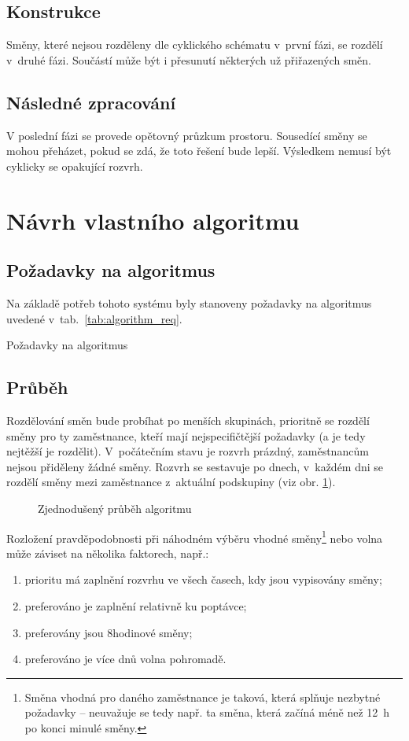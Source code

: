 \documentclass[twoside]{ctuthesis}
\begin{document}
\subsection{Konstrukce}
Směny, které nejsou rozděleny dle cyklického schématu v~první fázi, se rozdělí v~druhé fázi. Součástí může být i přesunutí některých už přiřazených směn.

\subsection{Následné zpracování}
V poslední fázi se provede opětovný průzkum prostoru. Sousedící směny se mohou přeházet, pokud se zdá, že toto řešení bude lepší. Výsledkem nemusí být cyklicky se opakující rozvrh.

\newpage
\section{Návrh vlastního algoritmu}

\subsection{Požadavky na algoritmus}
Na základě potřeb tohoto systému byly stanoveny požadavky na algoritmus uvedené v~tab.~\ref{tab:algorithm_req}.

\begin{table}[h!]
	
	\caption{Požadavky na algoritmus}
	\label{tab:algorithm_req}
\end{table}

\subsection{Průběh}
Rozdělování směn bude probíhat po menších skupinách, prioritně se rozdělí směny pro ty zaměstnance, kteří mají nejspecifičtější požadavky (a je tedy nejtěžší je rozdělit). V~počátečním stavu je rozvrh prázdný, zaměstnancům nejsou přiděleny žádné směny. Rozvrh se sestavuje po dnech, v~každém dni se rozdělí směny mezi zaměstnance z~aktuální podskupiny (viz obr. \ref{fig:dayflow}).

\begin{figure}[h]
	
	\caption{Zjednodušený průběh algoritmu}
	\label{fig:dayflow}
\end{figure}

Rozložení pravděpodobnosti při náhodném výběru vhodné směny\footnote{Směna vhodná pro daného zaměstnance je taková, která splňuje nezbytné požadavky -- neuvažuje se tedy např. ta směna, která začíná méně než 12~h po konci minulé směny.} nebo volna může záviset na několika faktorech, např.:
\begin{enumerate}
	\item prioritu má zaplnění rozvrhu ve všech časech, kdy jsou vypisovány směny;
	\item preferováno je zaplnění relativně ku poptávce;
	\item preferovány jsou 8hodinové směny;
	\item preferováno je více dnů volna pohromadě.
\end{enumerate}
\end{document}
